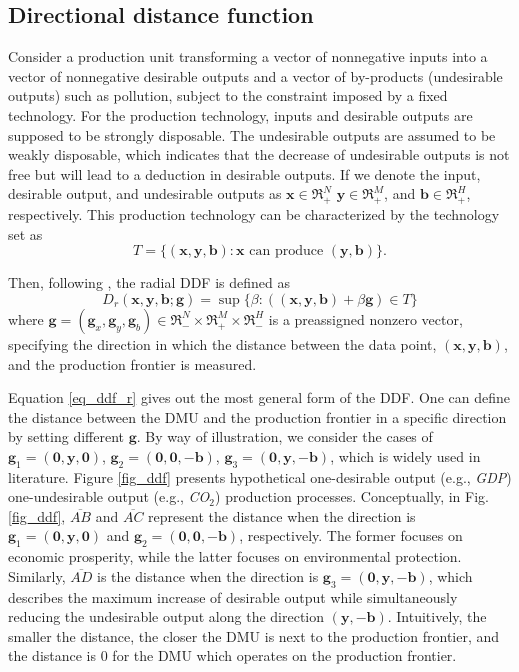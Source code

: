 \subsection{Directional distance function}
Consider a production unit transforming a vector of nonnegative inputs into a vector of nonnegative desirable outputs and a vector of by-products (undesirable outputs) such as pollution, subject to the constraint imposed by a fixed technology. For the production technology, inputs and desirable outputs are supposed to be strongly disposable. The undesirable outputs are assumed to be weakly disposable, which indicates that the decrease of undesirable outputs is not free but will lead to a deduction in desirable outputs.
If we denote the input, desirable output, and undesirable outputs as $\pmb{x} \in \Re _ + ^N$  $\pmb{y} \in \Re _ + ^M$, and $\pmb{b} \in \Re _ + ^H$, respectively. This production technology can be characterized by the technology set as
\begin{equation}\label{eq_tech}
    T = \{ (\pmb{x},\pmb{y},\pmb{b}) : \pmb{x} \text{ can produce } (\pmb{y},\pmb{b}) \}.
\end{equation}

Then, following \cite{Chung1997}, the radial DDF is defined as
\begin{equation}\label{eq_ddf_r}
    D_r (\pmb{x},\pmb{y},\pmb{b};\pmb{g}) = \sup \{ \beta :((\pmb{x},\pmb{y},\pmb{b}) + \beta \pmb{g}) \in T  \} 
\end{equation}
where $\pmb{g} = (\pmb{g}_x,\pmb{g}_y, \pmb{g}_b) \in \Re _ - ^N \times \Re _ + ^M \times \Re _ - ^H$ is a preassigned nonzero vector, specifying the direction in which the distance between the data point, $(\pmb{x},\pmb{y},\pmb{b})$, and the production frontier is measured. 

Equation \eqref{eq_ddf_r} gives out the most general form of the DDF. One can define the distance between the DMU and the production frontier in a specific direction by setting different $\pmb{g}$. By way of illustration, we consider the cases of  ${\pmb{g}_1} = (\pmb{0},\pmb{y},\pmb{0})$, ${\pmb{g}_2} = (\pmb{0},\pmb{0},-\pmb{b})$, ${\pmb{g}_3} = (\pmb{0},\pmb{y},-\pmb{b})$, which is widely used in literature. 
Figure \ref{fig_ddf} presents hypothetical one-desirable output (e.g., \textit{GDP}) one-undesirable output (e.g., \textit{CO$_2$}) production processes. 
Conceptually, in Fig. \ref{fig_ddf}, $\overline{\textit{AB}}$ and $\overline{\textit{AC}}$ represent the distance when the direction is ${\pmb{g}_1} = (\pmb{0},\pmb{y},\pmb{0})$ and ${\pmb{g}_2} = (\pmb{0},\pmb{0}, - \pmb{b})$, respectively. The former focuses on economic prosperity, while the latter focuses on environmental protection. Similarly, $\overline{\textit{AD}}$ is the distance when the direction is ${\pmb{g}_3} = (\pmb{0},\pmb{y}, - \pmb{b})$, which describes the maximum increase of desirable output while simultaneously reducing the undesirable output along the direction $(\pmb{y}, - \pmb{b})$. 
Intuitively, the smaller the distance, the closer the DMU is next to the production frontier, and the distance is 0 for the DMU which operates on the production frontier.

